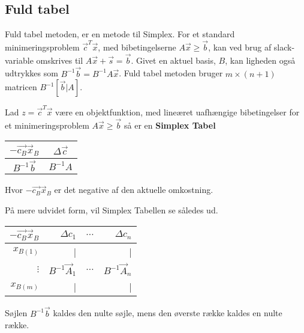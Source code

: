 \subsection{Fuld tabel}
Fuld tabel metoden, er en metode til Simplex. For et standard minimeringsproblem $\vec{c}^T\vec{x}$, med bibetingelserne $A\vec{x} \geq \vec{b}$, kan ved brug af slack-variable omskrives til $A\vec{x}+\vec{s}=\vec{b}$. Givet en aktuel basis, $B$, kan ligheden også udtrykkes som  $B^{-1}\vec{b}=B^{-1}A\vec{x}$. Fuld tabel metoden bruger $m \times (n+1)$ matricen $B^{-1}[\vec{b}|A]$.\\

\begin{defn}
Lad $z=\vec{c}^T\vec{x}$ være en objektfunktion, med lineæret uafhængige bibetingelser for et minimeringsproblem $A\vec{x} \geq \vec{b}$ så er en \textbf{Simplex Tabel}\\
\begin{center}
\begin{tabular}{| c | c |}
  \hline
  $-\vec{c_B}\vec{x}_B$&$\Delta\vec{c}$ \\ \hline			
  $B^{-1}\vec{b}$ & $B^{-1}A$ \\ \hline
\end{tabular}
\end{center}
Hvor $-\vec{c_B}\vec{x}_B$ er det negative af den aktuelle omkostning. 
\end{defn}


På mere udvidet form, vil Simplex Tabellen se således ud.
\begin{center}
\begin{tabular}{| r|r r r|}
  \hline	
  $-\vec{c_B}\vec{x}_B$&$\Delta c_1 $ & $\dots$ &$\Delta c_n$\\ \hline	
  $x_{B(1)}$ &	| & & |\\	
  $\vdots$  & $B^{-1}\vec{A}_1$ & $\hdots$ & $B^{-1}\vec{A}_n$\\
   $x_{B(m)}$ &	| & & |\\
   \hline
\end{tabular}
\end{center}
Søjlen $B^{-1}\vec{b}$ kaldes den nulte søjle, mens den øverste række kaldes en nulte række.

